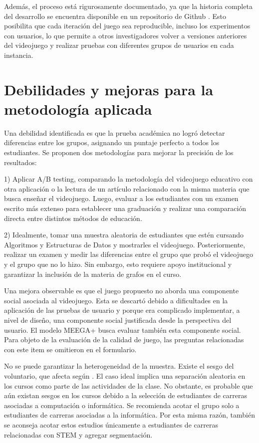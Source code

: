 Además, el proceso está rigurosamente documentado, ya que la historia completa del desarrollo se encuentra disponible en un repositorio de Github \cite{GithubRepo}. Esto posibilita que cada iteración del juego sea reproducible, incluso los experimentos con usuarios, lo que permite a otros investigadores volver a versiones anteriores del videojuego y realizar pruebas con diferentes grupos de usuarios en cada instancia.

\section{Debilidades y mejoras para la metodología aplicada}

Una debilidad identificada es que la prueba académica no logró detectar diferencias entre los grupos, asignando un puntaje perfecto a todos los estudiantes. Se proponen dos metodologías para mejorar la precisión de los resultados:

1) Aplicar A/B testing, comparando la metodología del videojuego educativo con otra aplicación o la lectura de un artículo relacionado con la misma materia que busca enseñar el videojuego. Luego, evaluar a los estudiantes con un examen escrito más extenso para establecer una graduación y realizar una comparación directa entre distintos métodos de educación.

2) Idealmente, tomar una muestra aleatoria de estudiantes que estén cursando Algoritmos y Estructuras de Datos y mostrarles el videojuego. Posteriormente, realizar un examen y medir las diferencias entre el grupo que probó el videojuego y el grupo que no lo hizo. Sin embargo, esto requiere apoyo institucional y garantizar la inclusión de la materia de grafos en el curso.


Una mejora observable es que el juego propuesto no aborda una componente social asociada al videojuego. Esta se descartó debido a dificultades en la aplicación de las pruebas de usuario y porque era complicado implementar, a nivel de diseño, una componente social justificada desde la perspectiva del usuario. El modelo MEEGA+ \cite{meegaplus} busca evaluar también esta componente social. Para objeto de la evaluación de la calidad de juego, las preguntas relacionadas con este item se omitieron en el formulario.

No se puede garantizar la heterogeneidad de la muestra. Existe el sesgo del voluntario, que afecta según \cite{volunterBias}. El caso ideal implica una separación aleatoria en los cursos como parte de las actividades de la clase. No obstante, es probable que aún existan sesgos en los cursos debido a la selección de estudiantes de carreras asociadas a computación o informática. Se recomienda acotar el grupo solo a estudiantes de carreras asociadas a la informática. Por esta misma razón, también se aconseja acotar estos estudios únicamente a estudiantes de carreras relacionadas con STEM y agregar segmentación.

